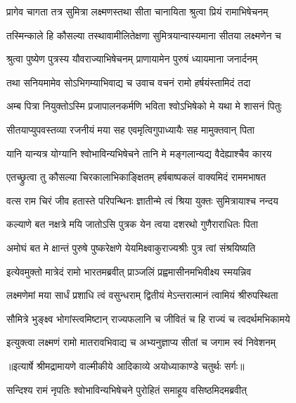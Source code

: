 \twolineshloka
{प्रागेव चागता तत्र सुमित्रा लक्ष्मणस्तथा}
{सीता चानायिता श्रुत्वा प्रियं रामाभिषेचनम्} %

\twolineshloka
{तस्मिन्काले हि कौसल्या तस्थावामीलितेक्षणा}
{सुमित्रयान्वास्यमाना सीतया लक्ष्मणेन च} %

\twolineshloka
{श्रुत्वा पुष्येण पुत्रस्य यौवराज्याभिषेचनम्}
{प्राणायामेन पुरुषं ध्यायमाना जनार्दनम्} %

\twolineshloka
{तथा सनियमामेव सोऽभिगम्याभिवाद्य च}
{उवाच वचनं रामो हर्षयंस्तामिदं तदा} %

\twolineshloka
{अम्ब पित्रा नियुक्तोऽस्मि प्रजापालनकर्मणि}
{भविता श्वोऽभिषेको मे यथा मे शासनं पितुः} %

\twolineshloka
{सीतयाप्युपवस्तव्या रजनीयं मया सह}
{एवमृत्विगुपाध्यायैः सह मामुक्तवान् पिता} %

\twolineshloka
{यानि यान्यत्र योग्यानि श्वोभाविन्यभिषेचने}
{तानि मे मङ्गलान्यद्य वैदेह्याश्चैव कारय} %

\twolineshloka
{एतच्छ्रुत्वा तु कौसल्या चिरकालाभिकाङ्क्षितम्}
{हर्षबाष्पकलं वाक्यमिदं राममभाषत} %

\twolineshloka
{वत्स राम चिरं जीव हतास्ते परिपन्थिनः}
{ज्ञातीन्मे त्वं श्रिया युक्तः सुमित्रायाश्च नन्दय} %

\twolineshloka
{कल्याणे बत नक्षत्रे मयि जातोऽसि पुत्रक}
{येन त्वया दशरथो गुणैराराधितः पिता} %

\twolineshloka
{अमोघं बत मे क्षान्तं पुरुषे पुष्करेक्षणे}
{येयमिक्ष्वाकुराज्यश्रीः पुत्र त्वां संश्रयिष्यति} %

\twolineshloka
{इत्येवमुक्तो मात्रेदं रामो भारतमब्रवीत्}
{प्राञ्जलिं प्रह्वमासीनमभिवीक्ष्य स्मयन्निव} %

\twolineshloka
{लक्ष्मणेमां मया सार्धं प्रशाधि त्वं वसुन्धराम्}
{द्वितीयं मेऽन्तरात्मानं त्वामियं श्रीरुपस्थिता} %

\twolineshloka
{सौमित्रे भुङ्क्ष्व भोगांस्त्वमिष्टान् राज्यफलानि च}
{जीवितं च हि राज्यं च त्वदर्थमभिकामये} %

\twolineshloka
{इत्युक्त्वा लक्ष्मणं रामो मातरावभिवाद्य च}
{अभ्यनुज्ञाप्य सीतां च जगाम स्वं निवेशनम्} %


{॥इत्यार्षे श्रीमद्रामायणे वाल्मीकीये आदिकाव्ये अयोध्याकाण्डे चतुर्थः सर्गः॥}


\twolineshloka
{सन्दिश्य रामं नृपतिः श्वोभाविन्यभिषेचने}
{पुरोहितं समाहूय वसिष्ठमिदमब्रवीत्} %

